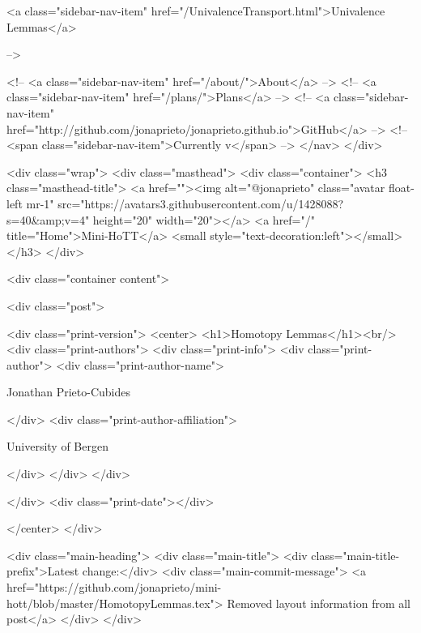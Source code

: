       
    
      
        
          <a class="sidebar-nav-item" href="/UnivalenceTransport.html">Univalence Lemmas</a>
        
      
     -->

    <!-- <a class="sidebar-nav-item" href="/about/">About</a> -->
    <!-- <a class="sidebar-nav-item" href="/plans/">Plans</a> -->
    <!-- <a class="sidebar-nav-item" href="http://github.com/jonaprieto/jonaprieto.github.io">GitHub</a> -->
    <!-- <span class="sidebar-nav-item">Currently v</span> -->
  </nav>
</div>

    <div class="wrap">
      <div class="masthead">
        <div class="container">
          <h3 class="masthead-title">
            <a href=""><img alt="@jonaprieto" class="avatar float-left mr-1" src="https://avatars3.githubusercontent.com/u/1428088?s=40&amp;v=4" height="20" width="20"></a>
            <a href="/" title="Home">Mini-HoTT</a>
            <small style="text-decoration:left"></small>
          </h3>
        </div>
      
      <div class="container content">
        







<div class="post">

  <div class="print-version">
    <center>
      <h1>Homotopy Lemmas</h1><br/>
        <div class="print-authors">
          <div class="print-info">
            <div class="print-author">
              <div class="print-author-name">
                
                  Jonathan Prieto-Cubides
                
              </div>
              <div class="print-author-affiliation">
                
                  University of Bergen
                
                </div>
            </div>
          </div>
          
          
        </div>
        <div class="print-date"></div>
        
        
    </center>
  </div>

  
  <div class="main-heading">
    <div class="main-title">
      <div class="main-title-prefix">Latest change:</div>
      <div class="main-commit-message">
            <a href="https://github.com/jonaprieto/mini-hott/blob/master/HomotopyLemmas.tex">
              Removed layout information from all post</a>
      </div>
    </div>

